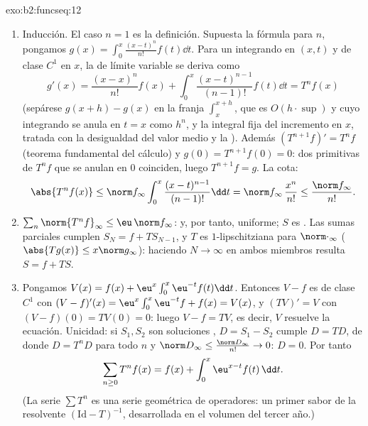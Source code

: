 \begin{solution}{exo:b2:funcseq:12}
\begin{enumerate}
  \item Inducción. El caso $n = 1$ es la definición. Supuesta la
        fórmula para $n$, pongamos $g(x) = \int_0^x
        \frac{(x-t)^n}{n!} f(t)\dd t$. Para un integrando 
        en $(x,t)$ y de clase $C^1$ en $x$, la
         de límite variable se deriva como
        \[
        g'(x) = \frac{(x-x)^n}{n!}f(x)
        + \int_0^x \frac{(x-t)^{n-1}}{(n-1)!}f(t)\dd t
        = T^nf(x)
        \]
        (sepárese $g(x+h) - g(x)$ en la franja $\int_x^{x+h}$, que
        es $O(h\cdot\sup)$ y cuyo integrando se anula en $t = x$
        como $h^n$, y la integral fija del incremento en $x$,
        tratada con la desigualdad del valor medio y la
        ). Además $(T^{n+1}f)' = T^nf$ (teorema
        fundamental del cálculo) y $g(0) = T^{n+1}f(0) = 0$: dos
        primitivas de $T^nf$ que se anulan en $0$ coinciden, luego
        $T^{n+1}f = g$. La cota:
        \[
        \abs{T^nf(x)} \leq \norm f_\infty
        \int_0^x \frac{(x-t)^{n-1}}{(n-1)!}\dd t
        = \norm f_\infty\,\frac{x^n}{n!}
        \leq \frac{\norm f_\infty}{n!} .
        \]
  \item $\sum_n \norm{T^nf}_\infty \leq \eu\,\norm f_\infty$:
         y, por tanto, uniforme; $S$ es
        . Las sumas parciales cumplen $S_N = f + T
        S_{N-1}$, y $T$ es $1$-lipschitziana para
        $\norm\cdot_\infty$ ($\abs{Tg(x)} \leq x\norm g_\infty$):
        haciendo $N \to \infty$ en ambos miembros resulta $S = f +
        TS$.
  \item Pongamos $V(x) = f(x) + \eu^x\int_0^x \eu^{-t}f(t)\dd t$.
        Entonces $V - f$ es de clase $C^1$ con $(V-f)'(x) =
        \eu^x\int_0^x\eu^{-t}f + f(x) = V(x)$, y $(TV)' = V$ con $(V
        - f)(0) = TV(0) = 0$: luego $V - f = TV$, es decir, $V$
        resuelve la ecuación. Unicidad: si $S_1, S_2$ son soluciones
        , $D = S_1 - S_2$ cumple $D = TD$, de donde $D =
        T^nD$ para todo $n$ y $\norm D_\infty \leq \frac{\norm
        D_\infty}{n!} \to 0$: $D = 0$. Por tanto
        \[
        \sum_{n\geq0} T^nf(x) = f(x) +
        \int_0^x \eu^{x-t}f(t)\,\dd t .
        \]
        (La serie $\sum T^n$ es una serie geométrica de operadores:
        un primer sabor de la resolvente $(\mathrm{Id} - T)^{-1}$,
        desarrollada en el volumen del tercer año.)
\end{enumerate}
\end{solution}

